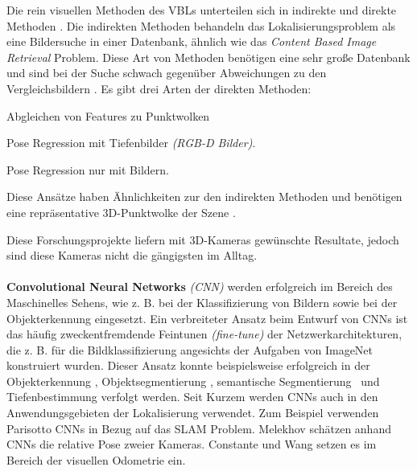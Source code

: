 Die rein visuellen Methoden des VBLs unterteilen sich in indirekte und direkte Methoden \cite{lowryVisualPlaceRecognition2016}. Die indirekten Methoden behandeln das Lokalisierungsproblem als eine Bildersuche in einer Datenbank, ähnlich wie das \textit{Content Based Image Retrieval} \cite{lewContentbasedMultimediaInformation2006} Problem. Diese Art von Methoden benötigen eine sehr große Datenbank und sind bei der Suche schwach gegenüber Abweichungen zu den Vergleichsbildern \cite{lowryVisualPlaceRecognition2016}. Es gibt drei Arten der direkten Methoden: 
\begin{enumerate*}[label=(\arabic*)]
	\item Abgleichen von Features zu Punktwolken
	\item Pose Regression mit Tiefenbilder \textit{(RGB-D Bilder)}.
	\item Pose Regression nur mit Bildern.
\end{enumerate*}

Diese Ansätze haben Ähnlichkeiten zur den indirekten Methoden und benötigen eine repräsentative 3D-Punktwolke der Szene  \cite{piascoSurveyVisualBasedLocalization2018}.


Diese Forschungsprojekte liefern mit 3D-Kameras gewünschte Resultate, jedoch sind diese Kameras nicht die gängigsten im Alltag.
\\\\
\textbf{Convolutional Neural Networks} \textit{(CNN)} werden erfolgreich im Bereich des Maschinelles Sehens, wie z. B. bei der Klassifizierung von Bildern \cite{krizhevskyImageNetClassificationDeep2012, simonyanVeryDeepConvolutional2014, heDeepResidualLearning2015} sowie bei der Objekterkennung \cite{girshickRichFeatureHierarchies2013, renFasterRCNNRealTime2015b, girshickFastRCNN2015} eingesetzt. 
Ein verbreiteter Ansatz beim Entwurf von CNNs ist das häufig zweckentfremdende Feintunen \textit{(fine-tune)} der Netzwerkarchitekturen, die z. B. für die Bildklassifizierung angesichts der Aufgaben von ImageNet \cite{russakovskyImageNetLargeScale2014} konstruiert wurden. Dieser Ansatz konnte beispielsweise erfolgreich in der Objekterkennung \cite{girshickFastRCNN2015}, Objektsegmentierung \cite{kokkinosPushingBoundariesBoundary2015, maninisConvolutionalOrientedBoundaries2016}, semantische Segmentierung \cite{nohLearningDeconvolutionNetwork2015, hazirbasFuseNetIncorporatingDepth2017a} und Tiefenbestimmung \cite{liDepthSurfaceNormal2015} verfolgt werden.
Seit Kurzem werden CNNs auch in den Anwendungsgebieten der Lokalisierung verwendet. Zum Beispiel verwenden Parisotto \etal\cite{parisottoGlobalPoseEstimation2018} CNNs in Bezug auf das SLAM Problem. Melekhov \etal\cite{melekhovRelativeCameraPose2017} schätzen anhand CNNs die relative Pose zweier Kameras. Constante \etal\cite{costanteExploringRepresentationLearning2016} und Wang \etal\cite{wangDeepVOEndtoendVisual2017} setzen es im Bereich der visuellen Odometrie ein.

